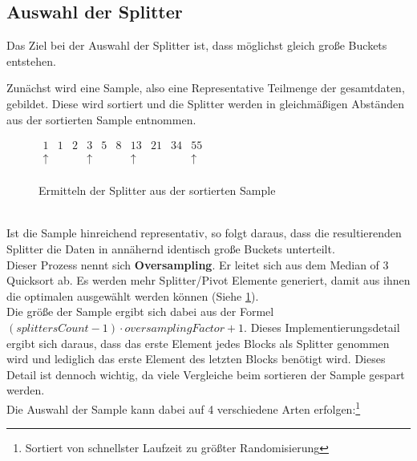 	\subsection{Auswahl der Splitter}
		Das Ziel bei der Auswahl der Splitter ist, dass möglichst gleich große Buckets entstehen.
		
		Zunächst wird eine Sample, also eine Representative Teilmenge der gesamtdaten, gebildet.
		Diese wird sortiert und die Splitter werden in gleichmäßigen Abständen aus der sortierten Sample entnommen.\\
		\begin{figure}[h]
			\caption{Ermitteln der Splitter aus der sortierten Sample \autocite{benson-2022}}
			\label{fig:splitters-from-sample}
			\begin{center}
				\begin{math}
					\begin{matrix}
							1    & 1 & 2 &     3    & 5 & 8 &    13    & 21 & 34 &    55    \\
						\uparrow &   &   & \uparrow &   &   & \uparrow &    &    & \uparrow \\
					\end{matrix}
				\end{math}
			\end{center}
		\end{figure}\\
		Ist die Sample hinreichend representativ, so folgt daraus, dass die resultierenden Splitter die Daten in annähernd identisch große Buckets unterteilt.\\
		Dieser Prozess nennt sich \textbf{Oversampling}.
		Er leitet sich aus dem Median of 3 Quicksort ab.
		Es werden mehr Splitter/Pivot Elemente generiert, damit aus ihnen die optimalen ausgewählt werden können (Siehe \ref{fig:splitters-from-sample}).\\
		Die größe der Sample ergibt sich dabei aus der Formel $(\textit{splittersCount}-1)\cdot\textit{oversamplingFactor}+1$.
		Dieses Implementierungsdetail ergibt sich daraus, dass das erste Element jedes Blocks als Splitter genommen wird und lediglich das erste Element des letzten Blocks benötigt wird.
		Dieses Detail ist dennoch wichtig, da viele Vergleiche beim sortieren der Sample gespart werden.\\
		Die Auswahl der Sample kann dabei auf 4 verschiedene Arten erfolgen:\footnote{Sortiert von schnellster Laufzeit zu größter Randomisierung} \autocite{berlin-2007}

